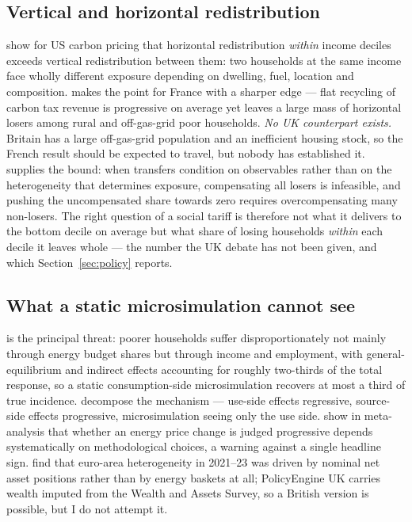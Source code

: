 \subsection{Vertical and horizontal redistribution}

\citet{cronin2019} show for US carbon pricing that horizontal redistribution \emph{within} income deciles exceeds vertical redistribution between them: two households at the same income face wholly different exposure depending on dwelling, fuel, location and composition. \citet{douenne2020} makes the point for France with a sharper edge --- flat recycling of carbon tax revenue is progressive on average yet leaves a large mass of horizontal losers among rural and off-gas-grid poor households. \emph{No UK counterpart exists.} Britain has a large off-gas-grid population and an inefficient housing stock, so the French result should be expected to travel, but nobody has established it. \citet{sallee2019} supplies the bound: when transfers condition on observables rather than on the heterogeneity that determines exposure, compensating all losers is infeasible, and pushing the uncompensated share towards zero requires overcompensating many non-losers. The right question of a social tariff is therefore not what it delivers to the bottom decile on average but what share of losing households \emph{within} each decile it leaves whole --- the number the UK debate has not been given, and which Section~\ref{sec:policy} reports.

\subsection{What a static microsimulation cannot see}

\citet{kanzig2023} is the principal threat: poorer households suffer disproportionately not mainly through energy budget shares but through income and employment, with general-equilibrium and indirect effects accounting for roughly two-thirds of the total response, so a static consumption-side microsimulation recovers at most a third of true incidence. \citet{goulder2019} decompose the mechanism --- use-side effects regressive, source-side effects progressive, microsimulation seeing only the use side. \citet{ohlendorf2021} show in meta-analysis that whether an energy price change is judged progressive depends systematically on methodological choices, a warning against a single headline sign. \citet{pallotti2024} find that euro-area heterogeneity in 2021--23 was driven by nominal net asset positions rather than by energy baskets at all; PolicyEngine UK carries wealth imputed from the Wealth and Assets Survey, so a British version is possible, but I do not attempt it.

